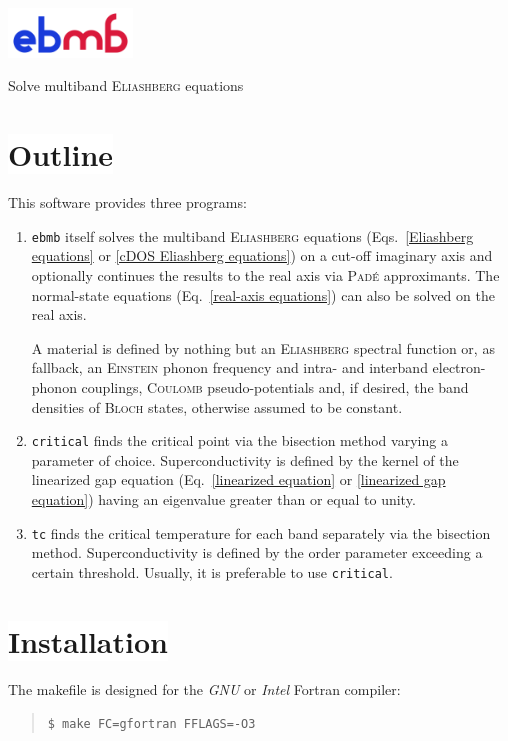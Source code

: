\documentclass[a4paper]{article}
\newlength\gap
\def\headline#1{\section*{%
   \normalsize\normalfont%
   \rlap{\rule[0.5ex]\textwidth{0.4pt}}%
   \qquad\colorbox{white}{#1}%
   }}
\begin{document}
   \begin{center}
      \includegraphics[width=33mm]{../logo/ebmb} \par \bigskip
      \large Solve multiband \textsc{Eliashberg} equations
   \end{center}

   \headline{Outline}

   This software provides three programs:
   \begin{enumerate}
      \item
         \texttt{ebmb} itself solves the multiband \textsc{Eliashberg} equations
         (Eqs.~\ref{Eliashberg equations} or \ref{cDOS Eliashberg equations}) on
         a cut-off imaginary axis and optionally continues the results to the
         real axis via \textsc{Padé} approximants. The normal-state equations
         (Eq.~\ref{real-axis equations}) can also be solved on the real axis.

         A material is defined by nothing but an \textsc{Eliashberg} spectral
         function or, as fallback, an \textsc{Einstein} phonon frequency and
         intra- and interband electron-phonon couplings, \textsc{Coulomb}
         pseudo-potentials and, if desired, the band densities of \textsc{Bloch}
         states, otherwise assumed to be constant.

      \item
         \texttt{critical} finds the critical point via the bisection method
         varying a parameter of choice. Superconductivity is defined by the
         kernel of the linearized gap equation (Eq.~\ref{linearized equation}
         or \ref{linearized gap equation}) having an eigenvalue greater than or
         equal to unity.

      \item
         \texttt{tc} finds the critical temperature for each band separately via
         the bisection method. Superconductivity is defined by the order
         parameter exceeding a certain threshold. Usually, it is preferable to
         use \texttt{critical}.

   \end{enumerate}

   \headline{Installation}

   The makefile is designed for the \emph{GNU} or \emph{Intel} Fortran compiler:
   \begin{quote}
      \verb|$ make FC=gfortran FFLAGS=-O3|
   \end{quote}
\end{document}
